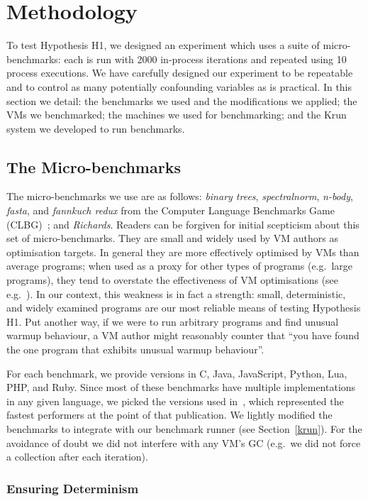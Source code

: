 \documentclass[preprint,numbers,10pt]{sigplanconf}
\newcommand{\krun}{Krun\xspace}
\newcommand{\binarytrees}{\emph{binary trees}\xspace}
\newcommand{\richards}{\emph{Richards}\xspace}
\newcommand{\spectralnorm}{\emph{spectralnorm}\xspace}
\newcommand{\nbody}{\emph{n-body}\xspace}
\newcommand{\fasta}{\emph{fasta}\xspace}
\newcommand{\fannkuch}{\emph{fannkuch redux}\xspace}
\begin{document}
\section{Methodology}
\label{sec:methodology}

To test Hypothesis H1, we designed an experiment which uses a suite of
micro-benchmarks: each is run with 2000 in-process iterations and repeated
using 10 process executions. We have carefully designed our
experiment to be repeatable and to control as many potentially confounding variables as
is practical. In this section we detail: the benchmarks we used and the modifications we
applied; the VMs we benchmarked; the machines we used for benchmarking; and the
\krun system we developed to run benchmarks.


\subsection{The Micro-benchmarks}

The micro-benchmarks we use are as follows: \binarytrees, \spectralnorm, \nbody,
\fasta, and \fannkuch from the Computer Language Benchmarks Game (CLBG)~\cite{clbg}; and
\richards. Readers can be forgiven for initial scepticism about this set of micro-benchmarks.
They are small and widely
used by VM authors as optimisation targets. In general they are more effectively
optimised by VMs than average programs; when used as a proxy for other types
of programs (e.g.~large programs), they tend to overstate the effectiveness of
VM optimisations (see e.g.~\cite{ratanaworabhan09jsmeter}). In our context, this weakness is in fact a strength:
small, deterministic, and widely examined programs are our most
reliable means of testing Hypothesis H1. Put another way, if we were to run arbitrary programs
and find unusual warmup behaviour, a VM author might reasonably counter that
``you have found the one program that exhibits unusual warmup behaviour''.

For each benchmark, we provide versions in C, Java, JavaScript, Python, Lua, PHP,
and Ruby. Since most of these
benchmarks have multiple implementations in any given language, we picked
the versions used in~\cite{bolz14impact}, which represented the fastest
performers at the point of that publication. We lightly modified
the benchmarks to integrate with our benchmark runner (see Section~\ref{krun}).
For the avoidance of doubt we did not interfere with any VM's GC (e.g.~we did not
force a collection after each iteration).


\subsubsection{Ensuring Determinism}
\end{document}
